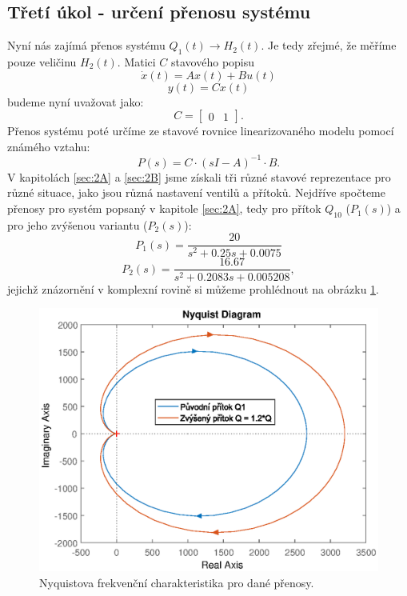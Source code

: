 \documentclass[a4paper,11pt]{article}
\begin{document}
\subsection{Třetí úkol - určení přenosu systému}\label{sec:3}
Nyní nás zajímá přenos systému $ Q_{1}\left ( t \right )\rightarrow H_{2}\left ( t \right ) $. Je tedy zřejmé, že měříme pouze veličinu $ H_{2}\left ( t \right ) $. Matici $ C $ stavového popisu
\begin{equation}
\dot{x}\left ( t \right )=Ax\left( t \right )+Bu \left( t \right)\end{equation}
\begin{equation}
y\left ( t \right )=Cx\left( t \right )
\end{equation}
budeme nyní uvažovat jako: $$C=\left [\begin{array}{cc}0 & 1\end{array}\right ].
$$
Přenos systému poté určíme ze stavové rovnice linearizovaného modelu pomocí známého vztahu:
\begin{equation}\label{eq:stav_popis} 
P\left ( s \right )=C\cdot \left ( sI-A \right )^{-1}\cdot B.
\end{equation}
V kapitolách \ref{sec:2A} a \ref{sec:2B} jsme získali tři různé stavové reprezentace pro různé situace, jako jsou různá nastavení ventilů a přítoků. Nejdříve spočteme přenosy pro systém popsaný v kapitole \ref{sec:2A}, tedy pro přítok $ Q_{10} $ ($ P_{1}\left ( s \right )  $) a pro jeho zvýšenou variantu ($ P_{2}\left ( s \right )  $):
\begin{equation}\label{eq:P-A1} 
P_{1}\left ( s \right ) =\frac{20}{s^{2} + 0.25 s + 0.0075}
\end{equation}
\begin{equation}\label{eq:P-A2} 
P_{2}\left ( s \right ) =\frac{16.67}{s^{2} + 0.2083  s + 0.005208},
\end{equation}
jejichž znázornění v komplexní rovině si můžeme prohlédnout na obrázku \ref{fig:nyquist-A}.
\begin{figure}[htbp]
	\begin{center}
	\includegraphics[scale = 1.0]{obrazky/nyquistA.eps}
	\caption{Nyquistova frekvenční charakteristika pro dané přenosy.}
	\label{fig:nyquist-A}
	\end{center}
\end{figure}
\end{document}
